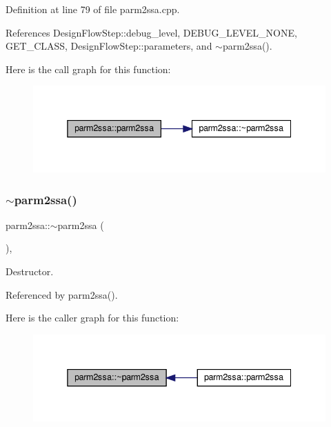 Definition at line 79 of file parm2ssa.\+cpp.



References Design\+Flow\+Step\+::debug\+\_\+level, D\+E\+B\+U\+G\+\_\+\+L\+E\+V\+E\+L\+\_\+\+N\+O\+NE, G\+E\+T\+\_\+\+C\+L\+A\+SS, Design\+Flow\+Step\+::parameters, and $\sim$parm2ssa().

Here is the call graph for this function\+:
\nopagebreak
\begin{figure}[H]
\begin{center}
\leavevmode
\includegraphics[width=338pt]{dc/d7a/classparm2ssa_aea62eab6928519e95df8a544661df5a3_cgraph}
\end{center}
\end{figure}
\mbox{\label{classparm2ssa_abd777e7c92f2b7c714bd73422a11c9af}} 
\subsubsection{\texorpdfstring{$\sim$parm2ssa()}{~parm2ssa()}}
{\footnotesize\ttfamily parm2ssa\+::$\sim$parm2ssa (\begin{DoxyParamCaption}{ }\end{DoxyParamCaption})\hspace{0.3cm}{\ttfamily [override]}, {\ttfamily [default]}}



Destructor. 



Referenced by parm2ssa().

Here is the caller graph for this function\+:
\nopagebreak
\begin{figure}[H]
\begin{center}
\leavevmode
\includegraphics[width=338pt]{dc/d7a/classparm2ssa_abd777e7c92f2b7c714bd73422a11c9af_icgraph}
\end{center}
\end{figure}


